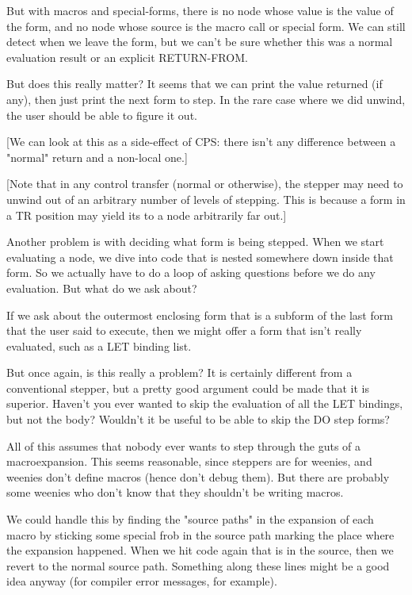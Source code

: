 But with macros and special-forms, there is no node whose value is the value of
the form, and no node whose source is the macro call or special form.  We can
still detect when we leave the form, but we can't be sure whether this was a
normal evaluation result or an explicit RETURN-FROM.  

But does this really matter?  It seems that we can print the value returned (if
any), then just print the next form to step.  In the rare case where we did
unwind, the user should be able to figure it out.  

[We can look at this as a side-effect of CPS: there isn't any difference
between a "normal" return and a non-local one.]

[Note that in any control transfer (normal or otherwise), the stepper may need
to unwind out of an arbitrary number of levels of stepping.  This is because a
form in a TR position may yield its to a node arbitrarily far out.]

Another problem is with deciding what form is being stepped.  When we start
evaluating a node, we dive into code that is nested somewhere down inside that
form.  So we actually have to do a loop of asking questions before we do any
evaluation.  But what do we ask about?

If we ask about the outermost enclosing form that is a subform of the last
form that the user said to execute, then we might offer a form that isn't
really evaluated, such as a LET binding list.  

But once again, is this really a problem?  It is certainly different from a
conventional stepper, but a pretty good argument could be made that it is
superior.  Haven't you ever wanted to skip the evaluation of all the
LET bindings, but not the body?  Wouldn't it be useful to be able to skip the
DO step forms?

All of this assumes that nobody ever wants to step through the guts of a
macroexpansion.  This seems reasonable, since steppers are for weenies, and
weenies don't define macros (hence don't debug them).  But there are probably
some weenies who don't know that they shouldn't be writing macros.

We could handle this by finding the "source paths" in the expansion of each
macro by sticking some special frob in the source path marking the place where
the expansion happened.  When we hit code again that is in the source, then we
revert to the normal source path.  Something along these lines might be a good
idea anyway (for compiler error messages, for example).  

